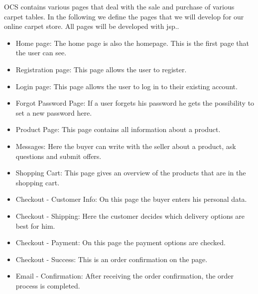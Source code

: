
OCS contains various pages that deal with the sale and purchase of various carpet tables. In the following we define the pages that we will develop for our online carpet store. All pages will be developed with jsp..

\begin{itemize}
    \item Home page: The home page is also the homepage. This is the first page that the user can see.
    \item Registration page: This page allows the user to register.
    \item Login page: This page allows the user to log in to their existing account.
    \item Forgot Password Page: If a user forgets his password he gets the possibility to set a new password here.
     \item Product Page: This page contains all information about a product.
    \item Messages: Here the buyer can write with the seller about a product, ask questions and submit offers.
    \item Shopping Cart: This page gives an overview of the products that are in the shopping cart.
     \item Checkout - Customer Info: On this page the buyer enters his personal data.
    \item Checkout - Shipping: Here the customer decides which delivery options are best for him. 
    \item Checkout - Payment: On this page the payment options are checked.
    \item Checkout - Success: This is an order confirmation on the page.
    \item Email - Confirmation: After receiving the order confirmation, the order process is completed.
\end{itemize}